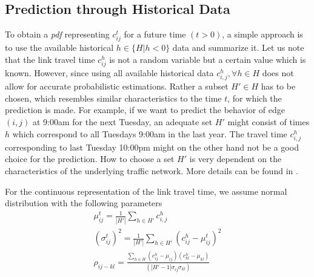 

\subsection{Prediction through Historical Data}
\label{subsec:historical}
To obtain a \textit{pdf} representing $c_{ij}^t$ for a future time $(t>0)$, a
simple approach is to use the available historical $h \in \{H| h < 0\}$ data and
summarize it.
Let us note that the link travel time $c_{ij}^h$ is not a random
variable but a certain value which is known. However, since using all available
historical data $c_{i,j}^h, \forall h \in H$ does not allow for
accurate probabilistic estimations. Rather a subset $H' \in H$ has to be chosen,
which resembles similar characteristics to the time $t$, for which the
prediction is made. For example, if we want to predict the behavior of edge
$(i,j)$ at 9:00am for the next Tuesday, an adequate set $H'$ might consist of
times $h$ which correspond to all Tuesdays 9:00am in the last year. The travel
time $c_{i,j}^h$ corresponding to last Tuesday 10:00pm might on the other hand
not be a good choice for the prediction. How to choose a set $H'$ is very
dependent on the characteristics of the underlying traffic network.
More details can be found in \cite{Pan12}.

For the continuous representation of the link travel time, we assume normal
distribution with the following parameters
\begin{gather}
	\mu_{ij}^t = \frac{1}{|H'|}\sum_{h\in H'} c_{i,j}^h\\ 
	(\sigma_{ij}^t)^2 = \frac{1}{|H'|}\sum_{h\in H'} (c_{ij}^h-\mu_{ij}^t)^2\\
	\rho_{ij-kl} = \frac{\sum_{h\in H} (c_{ij}^h - \mu_{ij}) (c_{kl}^h -
	\mu_{kl})}{(|H'-1| \sigma_{ij} \sigma_{kl})}
\end{gather}

